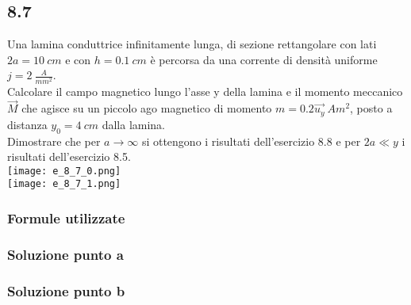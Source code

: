 \documentclass[../../main.tex]{subfiles}
\begin{document}
\subsection*{8.7}
Una lamina conduttrice infinitamente lunga, di sezione rettangolare con lati $2a = 10\ cm$ e con $h=0.1\ cm$ è percorsa da una corrente di densità uniforme $j = 2\ \frac{A}{mm^2}$.
\\Calcolare il campo magnetico lungo l'asse y della lamina e il momento meccanico $\vec{M}$ che agisce su un piccolo ago magnetico di momento $m = 0.2\vec{u_y}\ Am^2$, posto a distanza $y_0 = 4\ cm$ dalla lamina.
\\Dimostrare che per $a \rightarrow \infty$ si ottengono i risultati dell'esercizio 8.8 e per $2a \ll y$ i risultati dell'esercizio 8.5.
\\\texttt{[image: e\_8\_7\_0.png]}
\\\texttt{[image: e\_8\_7\_1.png]}
\subsubsection*{Formule utilizzate}
\subsubsection*{Soluzione punto a}
\subsubsection*{Soluzione punto b}
\newpage
\end{document}
